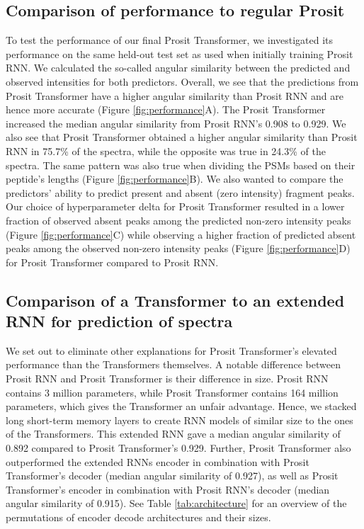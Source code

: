 \documentclass[10pt,a4paper]{article}
\begin{document}
\subsection*{Comparison of performance to regular Prosit}
    

To test the performance of our final Prosit Transformer, we investigated its performance on the same held-out test set as used when initially training Prosit RNN. We calculated the so-called angular similarity between the predicted and observed intensities for both predictors. Overall, we see that the predictions from Prosit Transformer have a higher angular similarity than Prosit RNN and are hence more accurate (Figure \ref{fig:performance}A). The Prosit Transformer increased the median angular similarity from Prosit RNN’s 0.908 to 0.929. We also see that Prosit Transformer obtained a higher angular similarity than Prosit RNN in 75.7\% of the spectra, while the opposite was true in 24.3\% of the spectra. The same pattern was also true when dividing the PSMs based on their peptide’s lengths (Figure \ref{fig:performance}B). We also wanted to compare the predictors’ ability to predict present and absent (zero intensity) fragment peaks.  Our choice of hyperparameter delta for Prosit Transformer resulted in a lower fraction of observed absent peaks among the predicted non-zero intensity peaks (Figure \ref{fig:performance}C) while observing a higher fraction of predicted absent peaks among the observed non-zero intensity peaks (Figure \ref{fig:performance}D) for Prosit Transformer compared to Prosit RNN.




\subsection*{Comparison of a Transformer to an extended RNN for prediction of spectra}

We set out to eliminate other explanations for Prosit Transformer's elevated performance than the Transformers themselves. A notable difference between Prosit RNN and Prosit Transformer is their difference in size. Prosit RNN contains 3 million parameters, while Prosit Transformer contains 164 million parameters, which gives the Transformer an unfair advantage. Hence, we stacked long short-term memory layers to create RNN models of similar size to the ones of the Transformers. This extended RNN gave a median angular similarity of 0.892 compared to Prosit Transformer's 0.929. Further, Prosit Transformer also outperformed the extended RNNs encoder in combination with Prosit Transformer’s decoder (median angular similarity of 0.927), as well as Prosit Transformer's encoder in combination with Prosit RNN's decoder (median angular similarity of 0.915). See Table \ref{tab:architecture} for an overview of the permutations of encoder decode architectures and their sizes.
\end{document}
